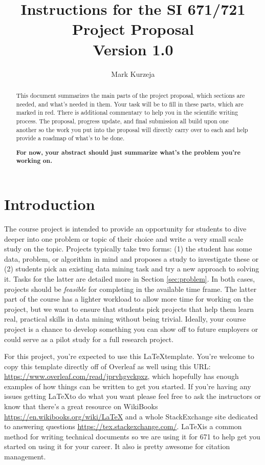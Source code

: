 \documentclass[11pt,a4paper]{article}
\title{Instructions for the SI 671/721 Project Proposal \\ {\small Version 1.0}}
\author{Mark Kurzeja}
\date{}
\begin{document}
\maketitle
\begin{abstract}

This document summarizes the main parts of the project proposal, which sections are needed, and what's needed in them.  Your task will be to fill in these parts, which are marked in red.  There is additional commentary to help you in the scientific writing process.  The proposal, progress update, and final submission all build upon one another so the work you put into the proposal will directly carry over to each and help provide a roadmap of what's to be done.

\textbf{\color{red} For now, your abstract should just summarize what's the problem you're working on.}
  
  
\end{abstract}

\section{Introduction}

The course project is intended to provide an opportunity for students to dive deeper into one problem or topic of their choice and write a very small scale study on the topic.  Projects typically take two forms: (1) the student has some data, problem, or algorithm in mind and proposes a study to investigate these or (2) students pick an existing data mining task and try a new approach to solving it.  Tasks for the latter are detailed more in Section \ref{sec:problem}.  In both cases, projects should be \textit{feasible} for completing in the available time frame.  The latter part of the course has a lighter workload to allow more time for working on the project, but we want to ensure that students pick projects that help them learn real, practical skills in data mining without being trivial.  Ideally, your course project is a chance to develop something you can show off to future employers or could serve as a pilot study for a full research project.

For this project, you're expected to use this \LaTeX template.  You're welcome to copy this template directly off of Overleaf as well using this URL: \url{https://www.overleaf.com/read/jprvhgvckpxz}, which hopefully has enough examples of how things can be written to get you started.  If you're having any issues getting \LaTeX to do what you want please feel free to ask the instructors or know that there's a great resource on WikiBooks \url{https://en.wikibooks.org/wiki/LaTeX} and a whole StackExchange site dedicated to answering questions \url{https://tex.stackexchange.com/}.   \LaTeX is a common method for writing technical documents so we are using it for 671 to help get you started on using it for your career.  It also is pretty awesome for citation management.
\end{document}
